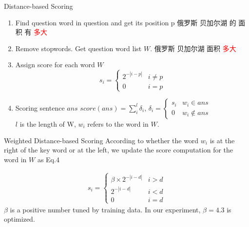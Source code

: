 \documentclass[aspectratio=169]{beamer} %
\begin{document}
  \begin{frame}{Distance-based Scoring}
    \begin{enumerate}
      \item Find question word in question and get its position p \newline
      俄罗斯 {} 贝加尔湖 {} 的 {} 面积 {} 有 {} \textcolor{red}{多大} 
      \item Remove stopwords. Get question word list $W$. \newline
      俄罗斯 {} 贝加尔湖 {} 面积 {} \textcolor{red}{多大} \\
       \qquad {}   

      \item Assign score for each word $W$ \newline
        \begin{equation}
          s_i = \begin{cases}2^{-|i-p|} & i \ne p \\ 0 & i = p \end{cases}
        \end{equation}
      \item Scoring sentence $ans$ \newline
        $ score(ans) = \sum_{i}^{l} {\delta}_i $, {}{}{} $ {\delta}_i=\begin{cases}s_i & w_i \in ans  \\ 0 & w_i \notin ans \end{cases} $ \\
        $l$ is the length of W, $w_i$ refers to the word in $W$.
    \end{enumerate}
  \end{frame}

  \begin{frame}{Weighted Distance-based Scoring}
    According to whether the word $w_i$ is at the right of the key word or at the left, we update the score computation for the word in $W$ as Eq.4  

      \begin{equation}
      \begin{aligned}
        s_i = \begin{cases} \beta \times 2^{-|i-d|} & i > d \\
         2^{-|i-d|} & i < d \\
         0 & i = d
         \end{cases}
      \end{aligned}
      \end{equation}
    $\beta$ is a positive number tuned by training data. In our experiment, $\beta = 4.3$ is optimized.
  \end{frame}
\end{document}
